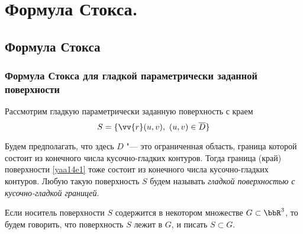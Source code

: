 \chapter{Формула Стокса.}
\section{Формула Стокса}
\subsection{Формула Стокса для гладкой параметрически заданной поверхности}
Рассмотрим гладкую параметрически заданную поверхность с краем
\begin{equation} \label{yaa14e1}
S=\{\vv{r}(u,v),\ (u,v)\in\overline{D} \}
\end{equation}

Будем предполагать, что здесь $D$ "--- это ограниченная область, граница которой состоит из конечного числа кусочно-гладких контуров. Тогда граница (край) поверхности \eqref{yaa14e1} тоже состоит из конечного числа кусочно-гладких контуров. Любую такую поверхность $S$ будем называть \textit{гладкой поверхностью с кусочно-гладкой границей}.

Если носитель поверхности $S$ содержится в некотором множестве $G\subset \bbR^3$, то будем говорить, что поверхность $S$ лежит в $G$, и писать $S\subset G$.


